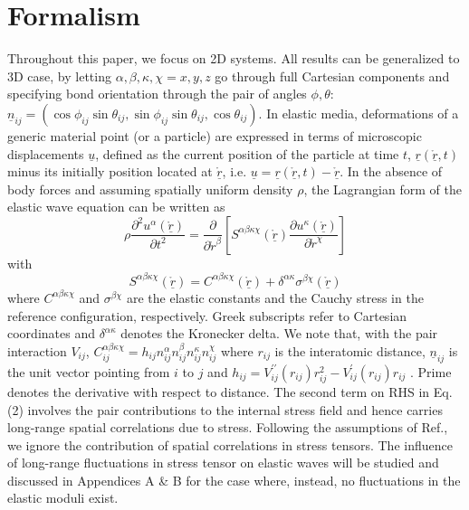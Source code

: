 \documentclass[twoside,twocolumn,9pt]{article}
\begin{document}
\section{Formalism}
Throughout this paper, we focus on 2D systems. All results can be generalized to 3D case, by letting $\alpha,\beta,\kappa,\chi=x,y,z$ go through full Cartesian components and specifying bond orientation through the pair of angles $\phi,\theta$: $\underline{n}_{ij}=(\cos\phi_{ij}\sin\theta_{ij},\sin\phi_{ij}\sin\theta_{ij},\cos\theta_{ij})$. In elastic media, deformations of a generic material point (or a particle) are expressed in terms of microscopic displacements $\underline{u}$, defined as the current position of the particle at time $t$, $\underline{r}(\underline{\mathring{r}},t)$ minus its initially position located at $\underline{\mathring{r}}$, i.e. $\underline{u}=\underline{r}(\underline{\mathring{r}},t)-\underline{\mathring{r}}$. In the absence of body forces and assuming spatially uniform density $\rho$, the Lagrangian form of the elastic wave equation can be written as \cite{Gelin2016}
\begin{equation}
\rho\frac{\partial^2u^\alpha(\underline{\mathring{r}})}{\partial t^2}=\frac{\partial}{\partial\mathring{r}^\beta}\left[S^{\alpha\beta\kappa\chi}(\underline{\mathring{r}})\frac{\partial u^\kappa(\underline{\mathring{r}})}{\partial\mathring{r}^\chi}\right]
\end{equation}
with
\begin{equation}
S^{\alpha\beta\kappa\chi}(\underline{\mathring{r}})=C^{\alpha\beta\kappa\chi}(\underline{\mathring{r}})+\delta^{\alpha\kappa}\sigma^{\beta\chi}(\underline{\mathring{r}})
\end{equation}
where $C^{\alpha\beta\kappa\chi}$ and $\sigma^{\beta\chi}$ are the elastic constants and the Cauchy stress in the reference configuration, respectively. Greek subscripts refer to Cartesian coordinates and $\delta^{\alpha\kappa}$ denotes the Kronecker delta.
We note that, with the pair interaction $V_{ij}$, $C_{ij}^{\alpha\beta\kappa\chi}=h_{ij}n_{ij}^\alpha n_{ij}^\beta n_{ij}^\kappa n_{ij}^\chi$ where $r_{ij}$ is the interatomic distance, $\underline{n}_{ij}$ is the unit vector pointing from $i$ to $j$ and $h_{ij}=V_{ij}^{\prime\prime}(r_{ij})r_{ij}^2-V^\prime_{ij}(r_{ij})r_{ij}$ \cite{Lemaitre2006}. Prime denotes the derivative with respect to distance. The second term on RHS in Eq. (2) involves the pair contributions to the internal stress field and hence carries long-range spatial correlations due to stress. Following the assumptions of Ref.\cite{Gelin2016}, we ignore the contribution of spatial correlations in stress tensors. The influence of long-range fluctuations in stress tensor on elastic waves will be studied and discussed in Appendices A \& B for the case where, instead, no fluctuations in the elastic moduli exist.
\end{document}
